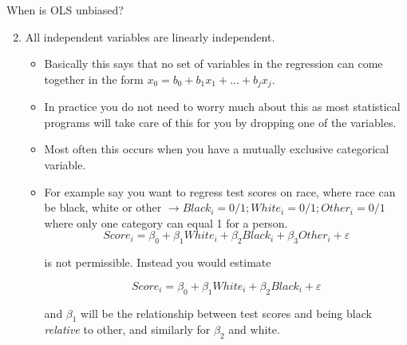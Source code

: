 \documentclass{beamer}
\begin{document}
\begin{frame}{When is OLS unbiased?}
    \begin{enumerate}
        \setcounter{enumi}{1}
        \item All independent variables are linearly independent.
            \begin{itemize} \footnotesize
                \item Basically this says that no set of variables in the regression can come together in the form $x_0 = b_0 + b_1x_1 + ... + b_jx_j.$
                \item In practice you do not need to worry much about this as most statistical programs will take care of this for you by dropping one of the variables.
                \item Most often this occurs when you have a mutually exclusive categorical variable.
                \item For example say you want to regress test scores on race, where race can be black, white or other $\rightarrow Black_i = 0/1; White_i = 0/1; Other_i = 0/1$ where only one category can equal 1 for a person.
                    \begin{equation*}
                       Score_i = \beta_0 + \beta_1White_i + \beta_2Black_i + \beta_3Other_i + \varepsilon
                    \end{equation*}

                    is not permissible. Instead you would estimate

                    \begin{equation*}
                       Score_i = \beta_0 + \beta_1White_i + \beta_2Black_i + \varepsilon
                    \end{equation*}

                    and $\beta_1$ will be the relationship between test scores and being black \textit{relative} to other, and similarly for $\beta_2$ and white.
                \end{itemize}
        \end{enumerate}
\end{frame}
\end{document}
